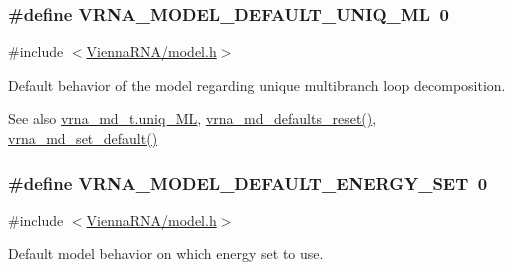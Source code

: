\subsubsection[{V\+R\+N\+A\+\_\+\+M\+O\+D\+E\+L\+\_\+\+D\+E\+F\+A\+U\+L\+T\+\_\+\+U\+N\+I\+Q\+\_\+\+M\+L}]{\setlength{\rightskip}{0pt plus 5cm}\#define V\+R\+N\+A\+\_\+\+M\+O\+D\+E\+L\+\_\+\+D\+E\+F\+A\+U\+L\+T\+\_\+\+U\+N\+I\+Q\+\_\+\+M\+L~0}\label{group__model__details_ga63f6006a02ba2d89148441f406c309e7}


{\ttfamily \#include $<$\hyperlink{model_8h}{Vienna\+R\+N\+A/model.\+h}$>$}



Default behavior of the model regarding unique multibranch loop decomposition. 

\begin{DoxySeeAlso}{See also}
\hyperlink{group__model__details_ade065b814a4e2e72ead93ab502613ed2}{vrna\+\_\+md\+\_\+t.\+uniq\+\_\+\+M\+L}, \hyperlink{group__model__details_ga70834424cf804d149937de89f80ceb45}{vrna\+\_\+md\+\_\+defaults\+\_\+reset()}, \hyperlink{group__model__details_ga8ac6ff84936282436f822644bf841f66}{vrna\+\_\+md\+\_\+set\+\_\+default()} 
\end{DoxySeeAlso}
\hypertarget{group__model__details_ga6fcf6b2d0f89256cdbd166486c9b6e1e}{}
\subsubsection[{V\+R\+N\+A\+\_\+\+M\+O\+D\+E\+L\+\_\+\+D\+E\+F\+A\+U\+L\+T\+\_\+\+E\+N\+E\+R\+G\+Y\+\_\+\+S\+E\+T}]{\setlength{\rightskip}{0pt plus 5cm}\#define V\+R\+N\+A\+\_\+\+M\+O\+D\+E\+L\+\_\+\+D\+E\+F\+A\+U\+L\+T\+\_\+\+E\+N\+E\+R\+G\+Y\+\_\+\+S\+E\+T~0}\label{group__model__details_ga6fcf6b2d0f89256cdbd166486c9b6e1e}


{\ttfamily \#include $<$\hyperlink{model_8h}{Vienna\+R\+N\+A/model.\+h}$>$}



Default model behavior on which energy set to use. 

